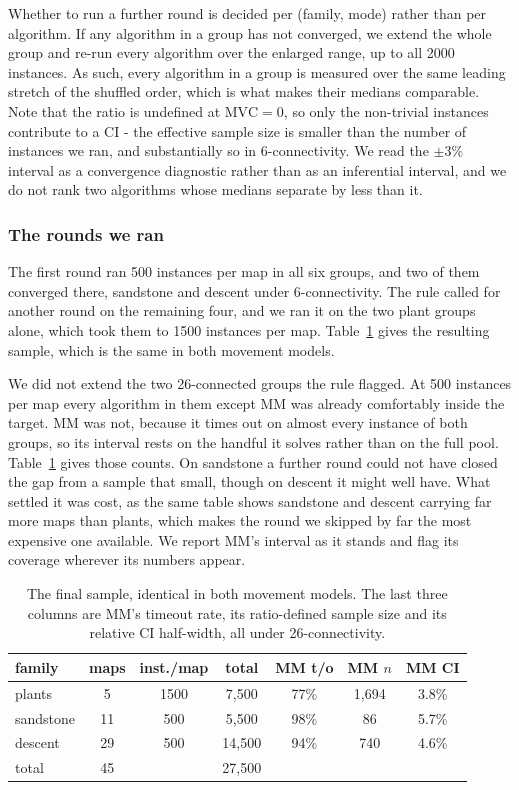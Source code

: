\documentclass[letterpaper]{article} %
\begin{document}
Whether to run a further round is decided per (family, mode) rather than per algorithm. If any algorithm in a group has not converged, we extend the whole group and re-run every algorithm over the enlarged range, up to all 2000 instances. As such, every algorithm in a group is measured over the same leading stretch of the shuffled order, which is what makes their medians comparable. Note that the ratio is undefined at $\text{MVC}=0$, so only the non-trivial instances contribute to a CI - the effective sample size is smaller than the number of instances we ran, and substantially so in 6-connectivity. We read the $\pm3\%$ interval as a convergence diagnostic rather than as an inferential interval, and we do not rank two algorithms whose medians separate by less than it.

\subsubsection{The rounds we ran}
The first round ran 500 instances per map in all six groups, and two of them converged there, sandstone and descent under 6-connectivity. The rule called for another round on the remaining four, and we ran it on the two plant groups alone, which took them to 1500 instances per map. Table~\ref{tab:sample} gives the resulting sample, which is the same in both movement models.

We did not extend the two 26-connected groups the rule flagged. At 500 instances per map every algorithm in them except MM was already comfortably inside the target. MM was not, because it times out on almost every instance of both groups, so its interval rests on the handful it solves rather than on the full pool. Table~\ref{tab:sample} gives those counts. On sandstone a further round could not have closed the gap from a sample that small, though on descent it might well have. What settled it was cost, as the same table shows sandstone and descent carrying far more maps than plants, which makes the round we skipped by far the most expensive one available. We report MM's interval as it stands and flag its coverage wherever its numbers appear.

\begin{table}[t] \centering\small \setlength{\tabcolsep}{3pt}
  \begin{tabular}{lcccccc}
    \toprule family & maps & inst./map & total & MM t/o & MM $n$ & MM CI \\
    \midrule plants & 5 & 1500 & 7{,}500 & 77\% & 1{,}694 & 3.8\% \\
    sandstone & 11 & 500 & 5{,}500 & 98\% & 86 & 5.7\% \\
    descent & 29 & 500 & 14{,}500 & 94\% & 740 & 4.6\% \\
    \midrule total & 45 & & 27{,}500 & & & \\
    \bottomrule
  \end{tabular}
  \caption{The final sample, identical in both movement models. The last three columns are MM's timeout rate, its ratio-defined sample size and its relative CI half-width, all under 26-connectivity.}\label{tab:sample}
\end{table}
\end{document}
